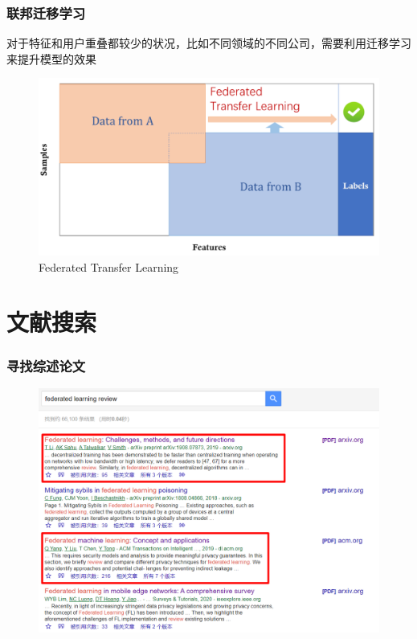 \documentclass[hyperref={pdfpagelabels=false}]{beamer}
\begin{document}
\begin{frame}
	\frametitle{联邦迁移学习}
	\begin{block}{}
		对于特征和用户重叠都较少的状况，比如不同领域的不同公司，需要利用迁移学习来提升模型的效果
	\end{block}
	\begin{figure}
		\centering
		\includegraphics[width=.6\textwidth]{./figure/fl-tran.png}
		\caption{Federated Transfer Learning\cite{Yang2019}}
	\end{figure}
\end{frame}

\section{文献搜索}
\begin{frame}
	\tableofcontents[currentsection]
\end{frame} 
\begin{frame}
	\frametitle{寻找综述论文}
	\begin{figure}
		\centering
		\includegraphics[height=0.8\textheight]{./figure/2.png}
	\end{figure}
\end{frame}
\end{document}
